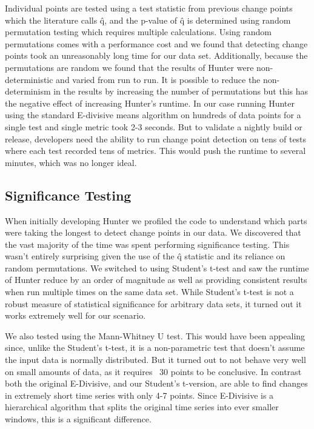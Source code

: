 \documentclass[sigconf]{acmart}
\begin{document}
Individual points are tested using a test statistic from previous change points which the literature
calls \^{q}, and the p-value of \^{q} is determined using random permutation testing which requires multiple calculations. Using random permutations comes with a performance cost and we found that detecting change points took an unreasonably long time for our data set. Additionally, because the permutations are random we found that the results of Hunter were non-deterministic and varied from run to run. It is possible to reduce the non-determinism in the results by increasing the number of permutations but this has the negative effect of increasing Hunter’s runtime. In our case running Hunter using the standard E-divisive means algorithm on hundreds of data points for a single test and single metric took 2-3 seconds. But to validate a nightly build or release, developers need the ability to run change point detection on tens of tests where each test recorded tens of metrics. This would push the runtime to several minutes, which was no longer ideal.


\subsection{Significance Testing}
When initially developing Hunter we profiled the code to understand which parts were taking the
longest to detect change points in our data. We discovered that the vast majority of the time was
spent performing significance testing. This wasn’t entirely surprising given the use of the \^{q} statistic and its reliance on random permutations. We switched to using Student’s t-test and saw the runtime of Hunter reduce by an order of magnitude as well as providing consistent results when run multiple times on the same data set. While Student’s t-test is not a robust measure of statistical significance for arbitrary data sets, it turned out it works extremely well for our scenario. 

We also tested using the Mann-Whitney U test. This would have been appealing since, unlike the
Student's t-test, it is a non-parametric test that doesn't assume the input data is normally
distributed. But it turned out to not behave very well on small amounts of data, as it requires ~30
points to be conclusive. In contrast both the original E-Divisive, and our Student's t-version, are
able to find changes in extremely short time series with only 4-7 points. Since E-Divisive is a hierarchical algorithm that splits the original time series into ever smaller windows, this is a significant difference.
\end{document}
